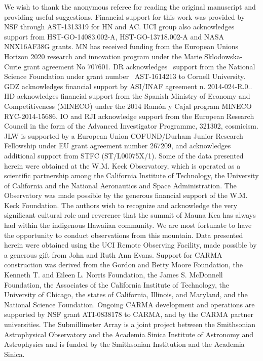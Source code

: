 \documentclass[iop,apj,useAMS,usenatbib]{emulateapj-rtx4}
\begin{document}
We wish to thank the anonymous referee for reading the original
manuscript and providing useful suggestions. Financial support for this work was provided by NSF
through AST-1313319 for HN and AC. UCI group also acknowledges
support from HST-GO-14083.002-A, HST-GO-13718.002-A and NASA
NNX16AF38G grants. MN has
received funding from the European Unions Horizon 2020 research and
innovation program under the Marie Sklodowska-Curie grant agreement No
707601. DR acknowledges
 support from the National Science Foundation under grant number
 AST-1614213 to Cornell University. GDZ acknowledges
financial support by ASI/INAF agreement n. 2014-024-R.0.. HD
acknowledges financial support from the Spanish Ministry of Economy
and Competitiveness (MINECO) under the 2014 Ram\'{o}n y Cajal program
MINECO RYC-2014-15686. IO and RJI acknowledge support from the
European Research Council in the form of the Advanced Investigator
Programme, 321302, {\sc cosmicism}. JLW is supported by a European
Union COFUND/Durham Junior Research Fellowship under EU grant
agreement number 267209, and acknowledges additional support from STFC
(ST/L00075X/1). Some of
the data presented herein were obtained at the W.M. Keck Observatory,
which is operated as a scientific partnership among the California
Institute of Technology, the University of California and the National
Aeronautics and Space Administration. The Observatory was made
possible by the generous financial support of the W.M. Keck
Foundation. The authors wish to recognize and acknowledge the very
significant cultural role and reverence that the summit of Mauna Kea
has always had within the indigenous Hawaiian community. We are most
fortunate to have the opportunity to conduct observations from this
mountain. Data presented herein were obtained using the UCI Remote Observing Facility, 
made possible by a generous gift from John and Ruth Ann Evans. Support for CARMA
construction was derived from the Gordon and Betty Moore
Foundation, the Kenneth T. and Eileen L. Norris Foundation,
the James S. McDonnell Foundation, the Associates of the California
Institute of Technology, the University of Chicago, the
states of California, Illinois, and Maryland, and the National
Science Foundation. Ongoing CARMA development and operations
are supported by NSF grant ATI-0838178 to CARMA,
and by the CARMA partner universities. The Submillimeter Array is a
joint project between the Smithsonian Astrophysical Observatory and
the Academia Sinica Institute of Astronomy and Astrophysics and is
funded by the Smithsonian Institution and the Academia Sinica.



\end{document}
